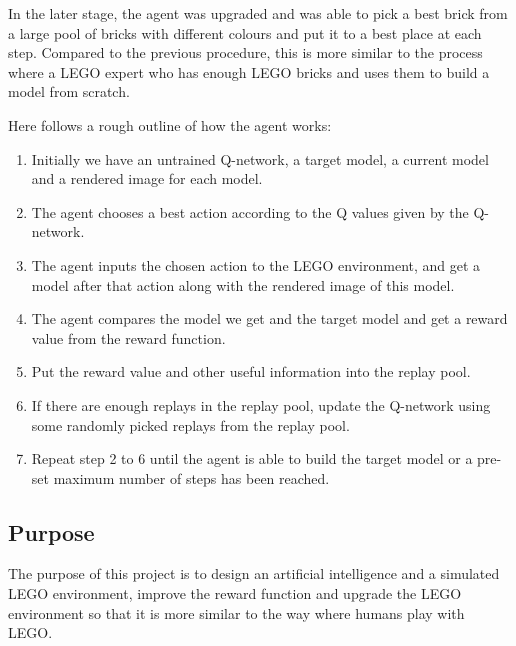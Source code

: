 \documentclass[a4paper]{article}
\begin{document}
            In the later stage, the agent was upgraded and was able to pick
            a best brick from a large pool of bricks with different colours
            and put it to a best place at each step. Compared to the previous
            procedure, this is more similar to the process where a LEGO expert
            who has enough LEGO bricks and uses them to build a model from
            scratch. 
            
            Here follows a rough outline of how the agent works: 
            
            \begin{enumerate}[leftmargin=1.5cm]
                \item Initially we have an untrained Q-network, a target
                model, a current model and a rendered image for each model.
                \item The agent chooses a best action according to the Q
                values given by the Q-network.
                \item The agent inputs the chosen action to the LEGO
                environment, and get a model after that action along with
                the rendered image of this model.
                \item The agent compares the model we get and the target
                model and get a reward value from the reward function.
                \item Put the reward value and other useful information
                into the replay pool.
                \item If there are enough replays in the replay pool, update
                the Q-network using some randomly picked replays from the
                replay pool.
                \item Repeat step 2 to 6 until the agent is able to build the
                target model or a pre-set maximum number of steps has been reached.
            \end{enumerate}
            
        \subsection{Purpose}
            The purpose of this project is to design an artificial intelligence
            and a simulated LEGO environment, improve the reward function and upgrade
            the LEGO environment so that it is more similar to the way where humans
            play with LEGO. 
            
\end{document}
